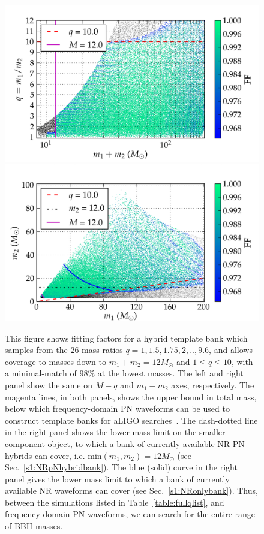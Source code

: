 \documentclass[aps,
prd,
twocolumn,
superscriptaddress,
lengthcheck,showpacs,letterpaper,nofootinbib,
floatfix]{revtex4-1}
\newcommand{\mn}{\mathrm{min}}
\begin{document}
\begin{figure}
\begin{center}
\includegraphics[width=\columnwidth]{bank_seperate_q1-4-35-4-65-9-6_01_mtot200_match-tiny.png}
\includegraphics[width=\columnwidth]{bank_seperate_q1-4-35-4-65-9-6_01_m1m2200_match-tiny.png}
\caption{\label{fig:templatebank_halfMassRatios}This figure shows
  fitting factors for a hybrid template bank which samples from the 26 mass
  ratios $q=1,1.5,1.75,2,..,9.6$, and allows coverage to masses down to 
  $m_1 + m_2 = 12M_{\odot}$ and $1\leq q\leq 10$, with a minimal-match of $98\%$
  at the lowest masses. 
  The left and right panel show the same on $M-q$ and $m_1-m_2$ axes, 
  respectively. The magenta lines, in both panels, shows the upper bound 
  in total mass, below which frequency-domain PN waveforms can be used to construct template banks for aLIGO
  searches~\cite{CompTemplates2009,Brown:2012nn}. The dash-dotted line
  in the right panel shows the lower mass limit on the smaller component object,
  to which a bank of currently available NR-PN hybrids can cover, i.e.
  $\mn(m_1,m_2)=12M_\odot$ (see Sec.~\ref{s1:NRpNhybridbank}). The blue (solid)
  curve in  the right panel gives the lower mass limit to which a bank of
  currently available NR waveforms can cover (see Sec.~\ref{s1:NRonlybank}).
  Thus, between the simulations listed in Table~\ref{table:fullqlist}, 
  and frequency domain PN waveforms, we can search for the entire range of 
  BBH masses.}
\end{center}
\end{figure}
\end{document}
